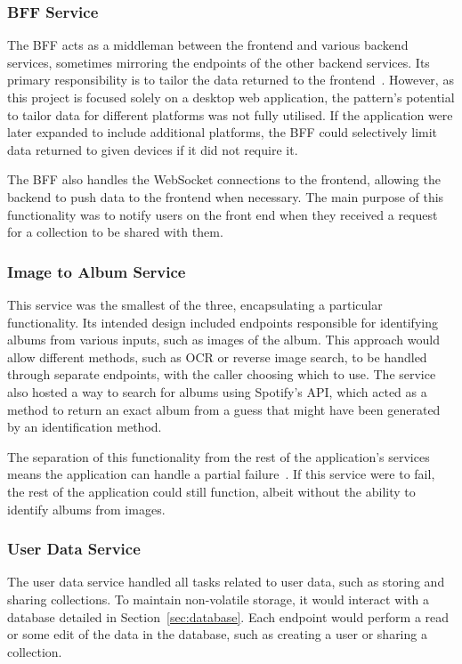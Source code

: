 \subsubsection{BFF Service}
The BFF acts as a middleman between the frontend and various backend services, sometimes mirroring the endpoints of the other backend services. Its primary responsibility is to tailor the data returned to the frontend~\cite{BFF}. However, as this project is focused solely on a desktop web application, the pattern's potential to tailor data for different platforms was not fully utilised. If the application were later expanded to include additional platforms, the BFF could selectively limit data returned to given devices if it did not require it.

The BFF also handles the WebSocket connections to the frontend, allowing the backend to push data to the frontend when necessary. The main purpose of this functionality was to notify users on the front end when they received a request for a collection to be shared with them.

\subsubsection{Image to Album Service}
This service was the smallest of the three, encapsulating a particular functionality. Its intended design included endpoints responsible for identifying albums from various inputs, such as images of the album. This approach would allow different methods, such as OCR or reverse image search, to be handled through separate endpoints, with the caller choosing which to use. The service also hosted a way to search for albums using Spotify's API, which acted as a method to return an exact album from a guess that might have been generated by an identification method.

The separation of this functionality from the rest of the application's services means the application can handle a partial failure~\cite{7333476}. If this service were to fail, the rest of the application could still function, albeit without the ability to identify albums from images.

\subsubsection{User Data Service}
The user data service handled all tasks related to user data, such as storing and sharing collections. To maintain non-volatile storage, it would interact with a database detailed in Section~\ref{sec:database}. Each endpoint would perform a read or some edit of the data in the database, such as creating a user or sharing a collection.

